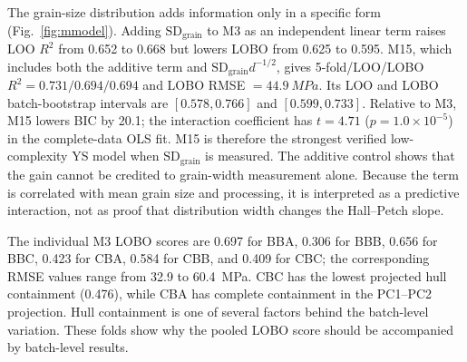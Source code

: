 \documentclass[5p,times,twocolumn]{elsarticle}
\begin{document}
The grain-size distribution adds information only in a specific form (Fig.~\ref{fig:mmodel}). Adding $\mathrm{SD}_{\mathrm{grain}}$ to M3 as an independent linear term raises LOO $R^2$ from 0.652 to 0.668 but lowers LOBO from 0.625 to 0.595. M15, which includes both the additive term and $\mathrm{SD}_{\mathrm{grain}}d^{-1/2}$, gives 5-fold/LOO/LOBO $R^2=0.731/0.694/0.694$ and LOBO RMSE $=\SI{44.9}{MPa}$. Its LOO and LOBO batch-bootstrap intervals are $[0.578,0.766]$ and $[0.599,0.733]$. Relative to M3, M15 lowers BIC by 20.1; the interaction coefficient has $t=4.71$ ($p=1.0\times10^{-5}$) in the complete-data OLS fit. M15 is therefore the strongest verified low-complexity YS model when $\mathrm{SD}_{\mathrm{grain}}$ is measured. The additive control shows that the gain cannot be credited to grain-width measurement alone. Because the term is correlated with mean grain size and processing, it is interpreted as a predictive interaction, not as proof that distribution width changes the Hall--Petch slope.

The individual M3 LOBO scores are 0.697 for BBA, 0.306 for BBB, 0.656 for BBC, 0.423 for CBA, 0.584 for CBB, and 0.409 for CBC; the corresponding RMSE values range from 32.9 to \SI{60.4}{MPa}. CBC has the lowest projected hull containment (0.476), while CBA has complete containment in the PC1--PC2 projection. Hull containment is one of several factors behind the batch-level variation. These folds show why the pooled LOBO score should be accompanied by batch-level results.
\end{document}
